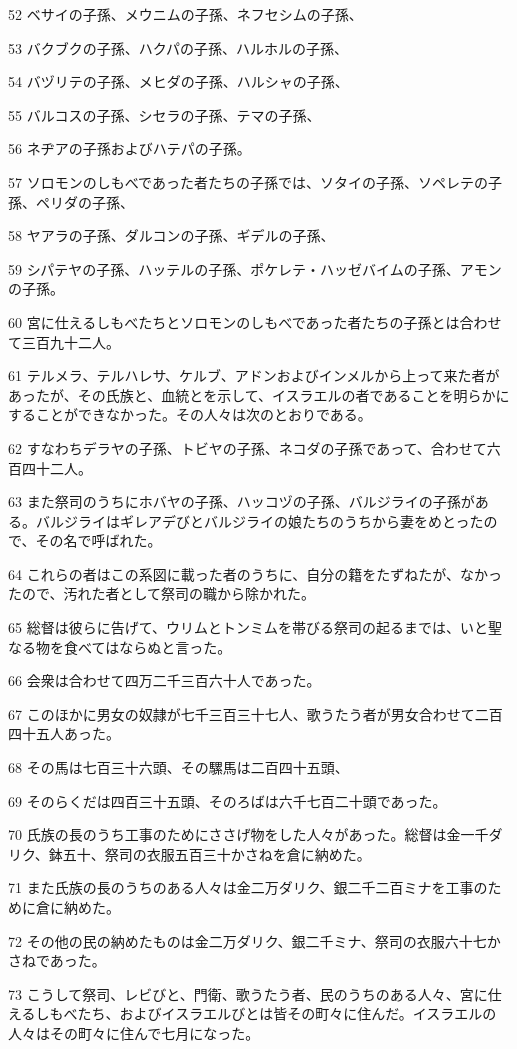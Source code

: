 \par 52 ベサイの子孫、メウニムの子孫、ネフセシムの子孫、
\par 53 バクブクの子孫、ハクパの子孫、ハルホルの子孫、
\par 54 バヅリテの子孫、メヒダの子孫、ハルシャの子孫、
\par 55 バルコスの子孫、シセラの子孫、テマの子孫、
\par 56 ネヂアの子孫およびハテパの子孫。
\par 57 ソロモンのしもべであった者たちの子孫では、ソタイの子孫、ソペレテの子孫、ペリダの子孫、
\par 58 ヤアラの子孫、ダルコンの子孫、ギデルの子孫、
\par 59 シパテヤの子孫、ハッテルの子孫、ポケレテ・ハッゼバイムの子孫、アモンの子孫。
\par 60 宮に仕えるしもべたちとソロモンのしもべであった者たちの子孫とは合わせて三百九十二人。
\par 61 テルメラ、テルハレサ、ケルブ、アドンおよびインメルから上って来た者があったが、その氏族と、血統とを示して、イスラエルの者であることを明らかにすることができなかった。その人々は次のとおりである。
\par 62 すなわちデラヤの子孫、トビヤの子孫、ネコダの子孫であって、合わせて六百四十二人。
\par 63 また祭司のうちにホバヤの子孫、ハッコヅの子孫、バルジライの子孫がある。バルジライはギレアデびとバルジライの娘たちのうちから妻をめとったので、その名で呼ばれた。
\par 64 これらの者はこの系図に載った者のうちに、自分の籍をたずねたが、なかったので、汚れた者として祭司の職から除かれた。
\par 65 総督は彼らに告げて、ウリムとトンミムを帯びる祭司の起るまでは、いと聖なる物を食べてはならぬと言った。
\par 66 会衆は合わせて四万二千三百六十人であった。
\par 67 このほかに男女の奴隷が七千三百三十七人、歌うたう者が男女合わせて二百四十五人あった。
\par 68 その馬は七百三十六頭、その騾馬は二百四十五頭、
\par 69 そのらくだは四百三十五頭、そのろばは六千七百二十頭であった。
\par 70 氏族の長のうち工事のためにささげ物をした人々があった。総督は金一千ダリク、鉢五十、祭司の衣服五百三十かさねを倉に納めた。
\par 71 また氏族の長のうちのある人々は金二万ダリク、銀二千二百ミナを工事のために倉に納めた。
\par 72 その他の民の納めたものは金二万ダリク、銀二千ミナ、祭司の衣服六十七かさねであった。
\par 73 こうして祭司、レビびと、門衛、歌うたう者、民のうちのある人々、宮に仕えるしもべたち、およびイスラエルびとは皆その町々に住んだ。イスラエルの人々はその町々に住んで七月になった。


